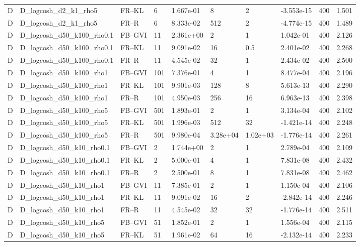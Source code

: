 \begin{tabular}{llllllllll}
D & D\_logcosh\_d2\_k1\_rho5 & FR--KL & 6 & 1.667e-01 & 8 & 2 & -3.553e-15 & 400 & 1.501 \\
D & D\_logcosh\_d2\_k1\_rho5 & FR--R & 6 & 8.333e-02 & 512 & 2 & -4.774e-15 & 400 & 1.489 \\
D & D\_logcosh\_d50\_k100\_rho0.1 & FB--GVI & 11 & 2.361e+00 & 2 & 1 & 1.042e-01 & 400 & 2.126 \\
D & D\_logcosh\_d50\_k100\_rho0.1 & FR--KL & 11 & 9.091e-02 & 16 & 0.5 & 2.401e-02 & 400 & 2.268 \\
D & D\_logcosh\_d50\_k100\_rho0.1 & FR--R & 11 & 4.545e-02 & 32 & 1 & 2.434e-02 & 400 & 2.500 \\
D & D\_logcosh\_d50\_k100\_rho1 & FB--GVI & 101 & 7.376e-01 & 4 & 1 & 8.477e-04 & 400 & 2.196 \\
D & D\_logcosh\_d50\_k100\_rho1 & FR--KL & 101 & 9.901e-03 & 128 & 8 & 5.613e-13 & 400 & 2.290 \\
D & D\_logcosh\_d50\_k100\_rho1 & FR--R & 101 & 4.950e-03 & 256 & 16 & 6.963e-13 & 400 & 2.398 \\
D & D\_logcosh\_d50\_k100\_rho5 & FB--GVI & 501 & 1.893e-01 & 2 & 1 & 3.134e-04 & 400 & 2.102 \\
D & D\_logcosh\_d50\_k100\_rho5 & FR--KL & 501 & 1.996e-03 & 512 & 32 & -1.421e-14 & 400 & 2.248 \\
D & D\_logcosh\_d50\_k100\_rho5 & FR--R & 501 & 9.980e-04 & 3.28e+04 & 1.02e+03 & -1.776e-14 & 400 & 2.261 \\
D & D\_logcosh\_d50\_k10\_rho0.1 & FB--GVI & 2 & 1.744e+00 & 2 & 1 & 2.789e-04 & 400 & 2.109 \\
D & D\_logcosh\_d50\_k10\_rho0.1 & FR--KL & 2 & 5.000e-01 & 4 & 1 & 7.831e-08 & 400 & 2.432 \\
D & D\_logcosh\_d50\_k10\_rho0.1 & FR--R & 2 & 2.500e-01 & 8 & 1 & 7.831e-08 & 400 & 2.462 \\
D & D\_logcosh\_d50\_k10\_rho1 & FB--GVI & 11 & 7.385e-01 & 2 & 1 & 1.150e-04 & 400 & 2.106 \\
D & D\_logcosh\_d50\_k10\_rho1 & FR--KL & 11 & 9.091e-02 & 16 & 2 & -2.842e-14 & 400 & 2.246 \\
D & D\_logcosh\_d50\_k10\_rho1 & FR--R & 11 & 4.545e-02 & 32 & 32 & -1.776e-14 & 400 & 2.511 \\
D & D\_logcosh\_d50\_k10\_rho5 & FB--GVI & 51 & 1.852e-01 & 2 & 1 & 1.556e-04 & 400 & 2.115 \\
D & D\_logcosh\_d50\_k10\_rho5 & FR--KL & 51 & 1.961e-02 & 64 & 16 & -2.132e-14 & 400 & 2.233 \\

\end{tabular}
